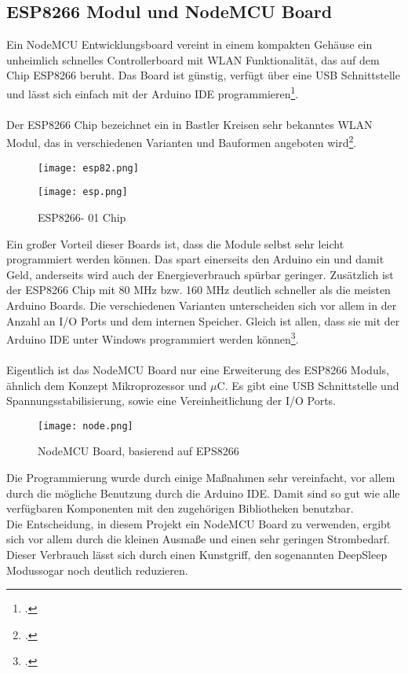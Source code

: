 \documentclass[12pt,a4paper]{scrartcl}	%
\begin{document}
\subsection{ESP8266 Modul und NodeMCU Board}
Ein NodeMCU Entwicklungsboard vereint in einem kompakten Gehäuse ein unheimlich schnelles Controllerboard mit WLAN Funktionalität, das auf dem Chip ESP8266 beruht. Das Board ist günstig, verfügt über eine USB Schnittstelle und lässt sich einfach mit der Arduino IDE programmieren\footcite[vgl][Abruf am 05.07.2018]{node}.\\
\\
Der ESP8266 Chip bezeichnet ein in Bastler Kreisen sehr bekanntes WLAN Modul, das in verschiedenen Varianten und Bauformen angeboten wird\footcite[vgl][Abruf am 05.07.2018]{node}.
\begin{figure}[htb]
	\centering
	\texttt{[image: esp82.png]}
\end{figure}
\begin{figure}[htb]
	\centering
	\texttt{[image: esp.png]}
	\caption{ESP8266- 01 Chip }
\end{figure}
Ein großer Vorteil dieser Boards ist, dass die Module selbst sehr leicht programmiert werden können. Das spart einerseits den Arduino ein und damit Geld, anderseits wird auch der Energieverbrauch spürbar geringer. Zusätzlich ist der ESP8266 Chip mit 80 MHz bzw. 160 MHz deutlich schneller als die meisten Arduino Boards. Die verschiedenen Varianten unterscheiden sich vor allem in der Anzahl an I/O Ports und dem internen Speicher. Gleich ist allen, dass sie mit der Arduino IDE unter Windows programmiert werden können\footcite[vgl][Abruf am 07.07.2018]{node}.\\
\\
Eigentlich ist das NodeMCU Board nur eine Erweiterung des ESP8266 Moduls, ähnlich dem Konzept Mikroprozessor und $\mu$C. Es gibt eine USB Schnittstelle und Spannungsstabilisierung, sowie eine Vereinheitlichung der I/O Ports.
\begin{figure}[htb]
	\centering
	\texttt{[image: node.png]}
	\caption{NodeMCU Board, basierend auf EPS8266 }
\end{figure}
Die Programmierung wurde durch einige Maßnahmen sehr vereinfacht, vor allem durch die mögliche Benutzung durch die Arduino IDE. Damit sind so gut wie alle verfügbaren Komponenten mit den zugehörigen Bibliotheken benutzbar.\\
Die Entscheidung, in diesem Projekt ein NodeMCU Board zu verwenden, ergibt sich vor allem durch die kleinen Ausmaße und einen sehr geringen Strombedarf. Dieser Verbrauch lässt sich durch einen Kunstgriff, den sogenannten \glqq DeepSleep Modus\grqq sogar noch deutlich reduzieren.
\end{document}
